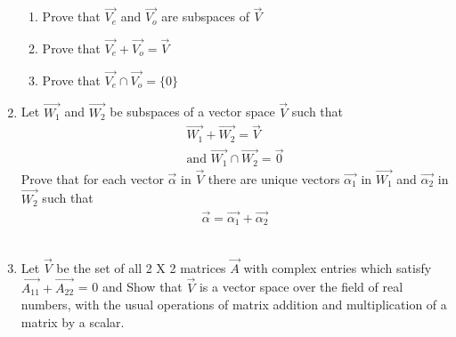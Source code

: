 \begin{enumerate}[label=\thesubsection.\arabic*.,ref=\thesubsection.\theenumi]
\begin{enumerate}
   \item Prove that $\vec{V_e}$ and $\vec{V_o}$ are subspaces of $\vec{V}$
   \item Prove that $\vec{V_e} + \vec{V_o} = \vec{V}$
    \item Prove that $\vec{V_e} \cap \vec{V_o} = \{0\}$
 \end{enumerate}
%
\solution

\item Let $\vec{W_1}$ and $\vec{W_2}$ be subspaces of a vector space $\vec{V}$ such that 
\begin{align}
   \vec{W_1}+\vec{W_2}=\vec{V} \\
   \text{and  }  \vec{W_1}\cap \vec{W_2}=\vec{0}\label{eq:solutions/2/2/9/1}
\end{align}
Prove that for each vector $\vec{\alpha}$ in $\vec{V}$ there are unique vectors $\vec{\alpha_1}$ in $\vec{W_1}$ and $\vec{\alpha_2}$ in $\vec{W_2}$ such that
\begin{align}
    \vec{\alpha}=\vec{\alpha_1}+\vec{\alpha_2}\label{eq:solutions/2/2/9/2}
\end{align}
%
\\
\solution

\item Let $\vec{V}$ be the set of all 2 X 2 matrices $\vec{A}$ with complex entries which satisfy $ \vec{A_{11}} + \vec{A_{22}}$ = 0 and Show that $\vec{V}$ is a vector space over the field of real numbers, with the
usual operations of matrix addition and multiplication of a matrix by a scalar. 
%
\\
\solution

%
\end{enumerate}


